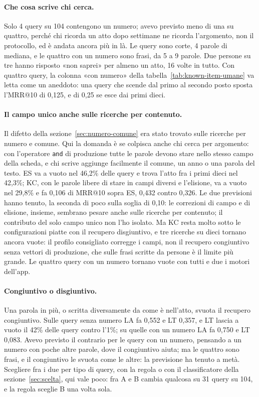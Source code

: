 \paragraph{Che cosa scrive chi cerca.} Solo 4 query su 104 contengono un
numero; avevo previsto meno di una su quattro, perché chi ricorda un atto dopo
settimane ne ricorda l'argomento, non il protocollo, ed è andata ancora più in
là. Le query sono corte, 4 parole di mediana, e le quattro con un numero sono
frasi, da 5 a 9 parole. Due persone su tre hanno risposto «non saprei» per
almeno un atto, 16 volte in tutto. Con quattro query, la colonna «con numero»
della tabella~\ref{tab:known-item-umane} va letta come un aneddoto: una
query che scende dal primo al secondo posto sposta l'MRR@10 di 0,125, e di 0,25 se
esce dai primi dieci.

\paragraph{Il campo unico anche sulle ricerche per contenuto.} Il difetto della
sezione~\ref{sec:numero-comune} era stato trovato sulle ricerche per numero e
comune. Qui la domanda è se colpisca anche chi cerca per argomento: con
l'operatore \texttt{and} di produzione tutte le parole devono stare nello
stesso campo della scheda, e chi scrive aggiunge facilmente il comune, un anno o
una parola del testo. ES va a vuoto nel 46,2\% delle query e trova l'atto fra i
primi dieci nel 42,3\%; KC, con le parole libere di stare in campi diversi e
l'elisione, va a vuoto nel 29,8\% e fa 0,106 di MRR@10 sopra ES, 0,432 contro
0,326. Le due previsioni hanno tenuto, la seconda di poco sulla soglia di
0,10: le correzioni di campo e di elisione, insieme, sembrano pesare anche sulle
ricerche per contenuto; il contributo del solo campo unico non l'ho isolato. Ma
KC resta molto sotto le configurazioni piatte con il recupero disgiuntivo, e
tre ricerche su dieci tornano ancora vuote: il profilo consigliato corregge i
campi, non il recupero congiuntivo senza vettori di produzione, che sulle frasi
scritte da persone è il limite più grande. Le quattro query con un numero tornano vuote
con tutti e due i motori dell'app.

\paragraph{Congiuntivo o disgiuntivo.} Una parola in più, o scritta
diversamente da come è nell'atto, svuota il recupero congiuntivo. Sulle query
senza numero LA fa 0,552 e LT 0,357, e LT lascia a vuoto il 42\% delle query
contro l'1\%; su quelle con un numero LA fa 0,750 e LT 0,083. Avevo previsto
il contrario per le query con un numero, pensando a un numero con poche altre
parole, dove il congiuntivo aiuta; ma le quattro sono frasi, e il congiuntivo le
svuota come le altre: la previsione ha tenuto a metà. Scegliere fra i due per
tipo di query, con la regola o con il classificatore della
sezione~\ref{sec:scelta}, qui vale poco: fra A e B cambia qualcosa su 31 query
su 104, e la regola sceglie B una volta sola.

